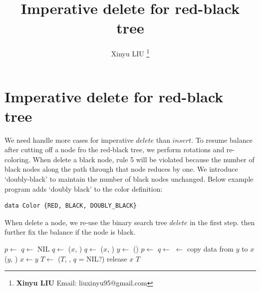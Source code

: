 \documentclass[b5paper]{article}
\begin{document}
\title{Imperative delete for red-black tree}

\author{Xinyu LIU
\thanks{{\bfseries Xinyu LIU} \newline
  Email: liuxinyu95@gmail.com \newline}
  }

\maketitle
\fi


\ifx\wholebook\relax
\chapter{Imperative delete for red-black tree}
\fi


We need handle more cases for imperative $delete$ than $insert$. To resume balance after cutting off a node fro the red-black tree, we perform rotations and re-coloring. When delete a black node, rule 5 will be violated because the number of black nodes along the path through that node reduces by one. We introduce `doubly-black' to maintain the number of black nodes unchanged. Below example program adds `doubly black' to the color definition:

\lstset{frame = single}
\begin{lstlisting}[language = Bourbaki]
data Color {RED, BLACK, DOUBLY_BLACK}
\end{lstlisting}

When delete a node, we re-use the binary search tree $delete$ in the first step. then further fix the balance if the node is black.

\begin{algorithmic}[1]
  \State $p \gets$ 
  \State $q \gets$ NIL
    \State $q \gets$ 
    \State {}($x$, ) 
    \State $q \gets$ 
    \State {}($x$, ) 
  \Else
    \State $y \gets$ ()
    \State $p \gets$ 
    \State $q \gets$ 
    \State {} $\gets$ 
    \State copy data from $y$ to $x$
    \State {}($y$, ) 
    \State $x \gets y$
  \EndIf
    \State $T \gets$ ($T$, , $q$ = NIL?)
  \EndIf
  \State release $x$
  \State \Return $T$
\EndFunction
\end{algorithmic}
\end{document}
